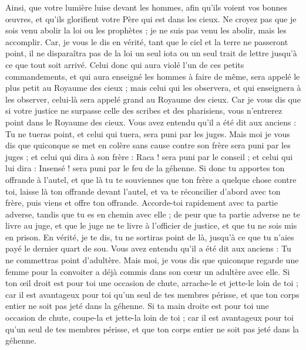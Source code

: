 \begin{multicols}{2}
Ainsi, que votre lumière luise devant les hommes, afin qu'ils voient vos bonnes œuvres, et qu'ils glorifient votre Père qui est dans les cieux.
Ne croyez pas que je sois venu abolir la loi ou les prophètes ; je ne suis pas venu les abolir, mais les accomplir.
Car, je vous le dis en vérité, tant que le ciel et la terre ne passeront point, il ne disparaîtra pas de la loi un seul iota ou un seul trait de lettre jusqu'à ce que tout soit arrivé.
Celui donc qui aura violé l'un de ces petits commandements, et qui aura enseigné les hommes à faire de même, sera appelé le plus petit au Royaume des cieux ; mais celui qui les observera, et qui enseignera à les observer, celui-là sera appelé grand au Royaume des cieux.
Car je vous dis que si votre justice ne surpasse celle des scribes et des pharisiens, vous n'entrerez point dans le Royaume des cieux.
Vous avez entendu qu'il a été dit aux anciens : Tu ne tueras point, et celui qui tuera, sera puni par les juges.
Mais moi je vous dis que quiconque se met en colère sans cause contre son frère sera puni par les juges ; et celui qui dira à son frère : Raca ! sera puni par le conseil ; et celui qui lui dira : Insensé ! sera puni par le feu de la géhenne.
Si donc tu apportes ton offrande à l'autel, et que là tu te souviennes que ton frère a quelque chose contre toi,
laisse là ton offrande devant l'autel, et va te réconcilier d'abord avec ton frère, puis viens et offre ton offrande.
Accorde-toi rapidement avec ta partie adverse, tandis que tu es en chemin avec elle ; de peur que ta partie adverse ne te livre au juge, et que le juge ne te livre à l'officier de justice, et que tu ne sois mis en prison.
En vérité, je te dis, tu ne sortiras point de là, jusqu'à ce que tu n'aies payé le dernier quart de sou.
Vous avez entendu qu'il a été dit aux anciens : Tu ne commettras point d'adultère.
Mais moi, je vous dis que quiconque regarde une femme pour la convoiter a déjà commis dans son cœur un adultère avec elle.
Si ton œil droit est pour toi une occasion de chute, arrache-le et jette-le loin de toi ; car il est avantageux pour toi qu'un seul de tes membres périsse, et que ton corps entier ne soit pas jeté dans la géhenne.
Si ta main droite est pour toi une occasion de chute, coupe-la et jette-la loin de toi ; car il est avantageux pour toi qu'un seul de tes membres périsse, et que ton corps entier ne soit pas jeté dans la géhenne.

\end{multicols}
